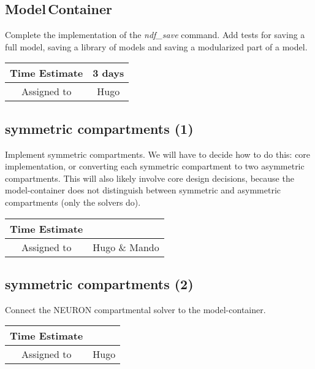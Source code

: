 \documentclass[12pt]{article}
\begin{document}
\subsection{Model\,Container}
Complete the implementation of the {\it ndf\_save} command.  Add tests for
saving a full model, saving a library of models and saving a
modularized part of a model.

\begin{center}
  \vspace{5mm}
  \centering
  \begin{tabular}{|c|c|}
    \hline
    Time Estimate
    & 3 days \\
    \hline
    Assigned to
    & Hugo \\
    \hline
  \end{tabular}
\end{center}


\subsection{symmetric compartments (1)}

Implement symmetric compartments.  We will have to decide how to do
this: core implementation, or converting each symmetric compartment to
two asymmetric compartments.  This will also likely involve core
design decisions, because the model-container does not distinguish
between symmetric and asymmetric compartments (only the solvers do).

\begin{center}
  \vspace{5mm}
  \centering
  \begin{tabular}{|c|c|}
    \hline
    Time Estimate
    & \\
    \hline
    Assigned to
    & Hugo \& Mando \\
    \hline
  \end{tabular}
\end{center}


\subsection{symmetric compartments (2)}

Connect the NEURON compartmental solver to the model-container.

\begin{center}
  \vspace{5mm}
  \centering
  \begin{tabular}{|c|c|}
    \hline
    Time Estimate
    & \\
    \hline
    Assigned to
    & Hugo \\
    \hline
  \end{tabular}
\end{center}
\end{document}
